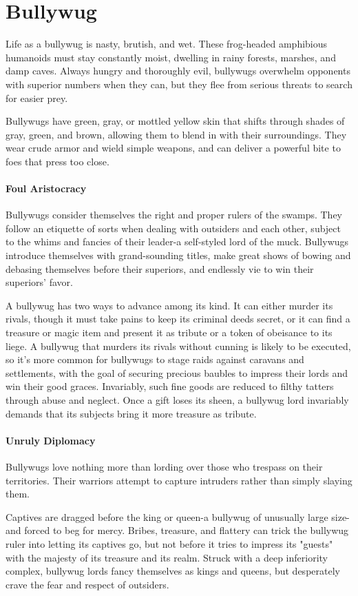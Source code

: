 \documentclass[letterpaper,openany,oneside,twocolumn]{book}
\begin{document}
\section*{Bullywug}
{\entryfont Life as a bullywug is nasty, brutish, and wet. These frog-headed amphibious humanoids must stay constantly moist, dwelling in rainy forests, marshes, and damp caves. Always hungry and thoroughly evil, bullywugs overwhelm opponents with superior numbers when they can, but they flee from serious threats to search for easier prey.

Bullywugs have green, gray, or mottled yellow skin that shifts through shades of gray, green, and brown, allowing them to blend in with their surroundings. They wear crude armor and wield simple weapons, and can deliver a powerful bite to foes that press too close.

\paragraph*{Foul Aristocracy} Bullywugs consider themselves the right and proper rulers of the swamps. They follow an etiquette of sorts when dealing with outsiders and each other, subject to the whims and fancies of their leader-a self-styled lord of the muck. Bullywugs introduce themselves with grand-sounding titles, make great shows of bowing and debasing themselves before their superiors, and endlessly vie to win their superiors' favor.

A bullywug has two ways to advance among its kind. It can either murder its rivals, though it must take pains to keep its criminal deeds secret, or it can find a treasure or magic item and present it as tribute or a token of obeisance to its liege. A bullywug that murders its rivals without cunning is likely to be executed, so it's more common for bullywugs to stage raids against caravans and settlements, with the goal of securing precious baubles to impress their lords and win their good graces. Invariably, such fine goods are reduced to filthy tatters through abuse and neglect. Once a gift loses its sheen, a bullywug lord invariably demands that its subjects bring it more treasure as tribute.

\paragraph*{Unruly Diplomacy} Bullywugs love nothing more than lording over those who trespass on their territories. Their warriors attempt to capture intruders rather than simply slaying them.

Captives are dragged before the king or queen-a bullywug of unusually large size-and forced to beg for mercy. Bribes, treasure, and flattery can trick the bullywug ruler into letting its captives go, but not before it tries to impress its "guests" with the majesty of its treasure and its realm. Struck with a deep inferiority complex, bullywug lords fancy themselves as kings and queens, but desperately crave the fear and respect of outsiders.}
\end{document}
